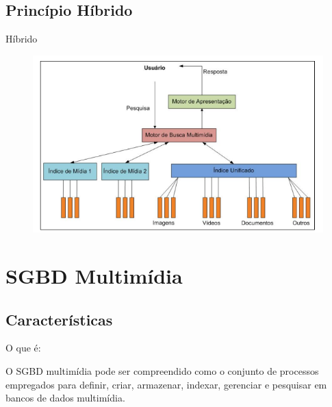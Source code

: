 \documentclass{beamer}
\begin{document}
    \subsection{Princípio Híbrido}
        \begin{frame}{Híbrido}
                
            \begin{figure}[htpb]
                \begin{center}
                    \includegraphics[width=0.8\linewidth]{pic/Híbrido.png}
                \end{center}
            \end{figure}
            
        \end{frame}
    
        

    
\section{SGBD Multimídia}
    
    \subsection{Características}
        \begin{frame}{O que é:}
        
        O SGBD multimídia pode ser compreendido como o conjunto de processos empregados
        para definir, criar, armazenar, indexar, gerenciar e pesquisar em bancos de dados multimídia.
        
        \end{frame}
        
\end{document}
